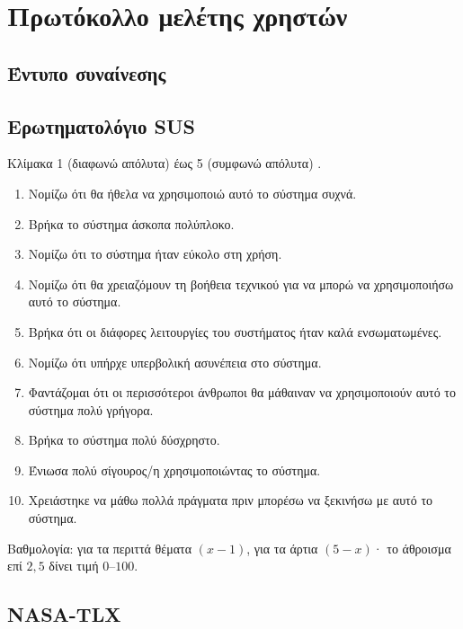 \chapter{Πρωτόκολλο μελέτης χρηστών}
\label{app:userstudy}

\section{Έντυπο συναίνεσης}

\section{Ερωτηματολόγιο SUS}

Κλίμακα 1 (διαφωνώ απόλυτα) έως 5 (συμφωνώ απόλυτα) \cite{brooke1996sus}.


\begin{enumerate}
  \item Νομίζω ότι θα ήθελα να χρησιμοποιώ αυτό το σύστημα συχνά.
  \item Βρήκα το σύστημα άσκοπα πολύπλοκο.
  \item Νομίζω ότι το σύστημα ήταν εύκολο στη χρήση.
  \item Νομίζω ότι θα χρειαζόμουν τη βοήθεια τεχνικού για να μπορώ να χρησιμοποιήσω αυτό το σύστημα.
  \item Βρήκα ότι οι διάφορες λειτουργίες του συστήματος ήταν καλά ενσωματωμένες.
  \item Νομίζω ότι υπήρχε υπερβολική ασυνέπεια στο σύστημα.
  \item Φαντάζομαι ότι οι περισσότεροι άνθρωποι θα μάθαιναν να χρησιμοποιούν αυτό το σύστημα πολύ γρήγορα.
  \item Βρήκα το σύστημα πολύ δύσχρηστο.
  \item Ένιωσα πολύ σίγουρος/η χρησιμοποιώντας το σύστημα.
  \item Χρειάστηκε να μάθω πολλά πράγματα πριν μπορέσω να ξεκινήσω με αυτό το σύστημα.
\end{enumerate}

Βαθμολογία: για τα περιττά θέματα $(x-1)$, για τα άρτια $(5-x)$· το άθροισμα επί $2{,}5$ δίνει τιμή $0$--$100$.

\section{NASA-TLX}

